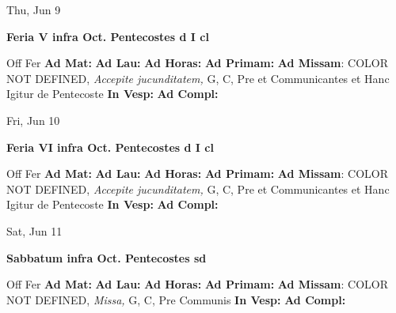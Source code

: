 \documentclass[10pt]{memoir}
\begin{document}
\begin{center}
\begin{minipage}{3.5in}
\vspace{2em}
\begin{center}Thu, Jun 9
\end{center}
\textbf{ \large Feria V infra Oct. Pentecostes
\textnormal{\normalsize d I cl}}

\begin{justify}Off Fer
\textbf{Ad Mat: }
\textbf{Ad Lau: }
\textbf{Ad Horas: }
\textbf{Ad Primam: }\textbf{Ad Missam}: COLOR NOT DEFINED, \textit{Accepite jucunditatem,} G, C, Pre et Communicantes et Hanc Igitur de Pentecoste
\textbf{In Vesp: }
\textbf{Ad Compl: }
\end{justify}
\end{minipage}
\end{center}

\begin{center}
\begin{minipage}{3.5in}
\vspace{2em}
\begin{center}Fri, Jun 10
\end{center}
\textbf{ \large Feria VI infra Oct. Pentecostes
\textnormal{\normalsize d I cl}}

\begin{justify}Off Fer
\textbf{Ad Mat: }
\textbf{Ad Lau: }
\textbf{Ad Horas: }
\textbf{Ad Primam: }\textbf{Ad Missam}: COLOR NOT DEFINED, \textit{Accepite jucunditatem,} G, C, Pre et Communicantes et Hanc Igitur de Pentecoste
\textbf{In Vesp: }
\textbf{Ad Compl: }
\end{justify}
\end{minipage}
\end{center}

\begin{center}
\begin{minipage}{3.5in}
\vspace{2em}
\begin{center}Sat, Jun 11
\end{center}
\textbf{ \large Sabbatum infra Oct. Pentecostes
\textnormal{\normalsize sd}}

\begin{justify}Off Fer
\textbf{Ad Mat: }
\textbf{Ad Lau: }
\textbf{Ad Horas: }
\textbf{Ad Primam: }\textbf{Ad Missam}: COLOR NOT DEFINED, \textit{Missa,} G, C, Pre Communis
\textbf{In Vesp: }
\textbf{Ad Compl: }
\end{justify}
\end{minipage}
\end{center}
\end{document}

